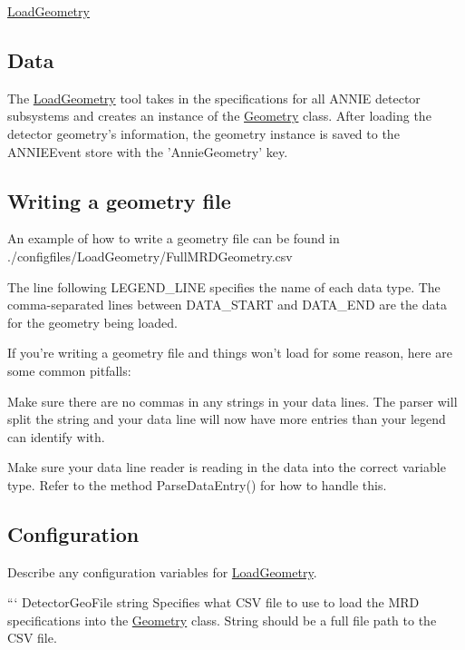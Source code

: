 \hyperlink{classLoadGeometry}{Load\-Geometry}

\subsection*{Data}

The \hyperlink{classLoadGeometry}{Load\-Geometry} tool takes in the specifications for all A\-N\-N\-I\-E detector subsystems and creates an instance of the \hyperlink{classGeometry}{Geometry} class. After loading the detector geometry's information, the geometry instance is saved to the A\-N\-N\-I\-E\-Event store with the 'Annie\-Geometry' key.

\subsection*{Writing a geometry file}

An example of how to write a geometry file can be found in ./configfiles/\-Load\-Geometry/\-Full\-M\-R\-D\-Geometry.csv

The line following L\-E\-G\-E\-N\-D\-\_\-\-L\-I\-N\-E specifies the name of each data type. The comma-\/separated lines between D\-A\-T\-A\-\_\-\-S\-T\-A\-R\-T and D\-A\-T\-A\-\_\-\-E\-N\-D are the data for the geometry being loaded.

If you're writing a geometry file and things won't load for some reason, here are some common pitfalls\-:
\begin{DoxyItemize}
\item Make sure there are no commas in any strings in your data lines. The parser will split the string and your data line will now have more entries than your legend can identify with.
\item Make sure your data line reader is reading in the data into the correct variable type. Refer to the method Parse\-Data\-Entry() for how to handle this.
\end{DoxyItemize}

\subsection*{Configuration}

Describe any configuration variables for \hyperlink{classLoadGeometry}{Load\-Geometry}.

``` Detector\-Geo\-File string Specifies what C\-S\-V file to use to load the M\-R\-D specifications into the \hyperlink{classGeometry}{Geometry} class. String should be a full file path to the C\-S\-V file.

